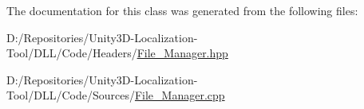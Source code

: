 The documentation for this class was generated from the following files\+:\begin{DoxyCompactItemize}
\item 
D\+:/\+Repositories/\+Unity3\+D-\/\+Localization-\/\+Tool/\+D\+L\+L/\+Code/\+Headers/\mbox{\hyperlink{_file___manager_8hpp}{File\+\_\+\+Manager.\+hpp}}\item 
D\+:/\+Repositories/\+Unity3\+D-\/\+Localization-\/\+Tool/\+D\+L\+L/\+Code/\+Sources/\mbox{\hyperlink{_file___manager_8cpp}{File\+\_\+\+Manager.\+cpp}}\end{DoxyCompactItemize}
